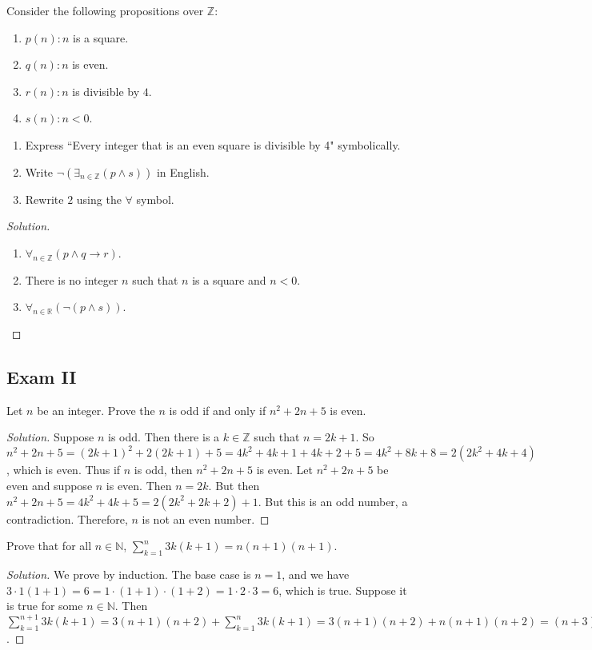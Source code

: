 \documentclass[../main.tex]{subfiles}
\begin{document}
\begin{problem}
Consider the following propositions over $\mathbb{Z}$:
\begin{enumerate}
\item[] $p(n):	n$ is a square.
\item[] $q(n):	n$ is even.
\item[] $r(n):	n$ is divisible by $4$.
\item[] $s(n):	n<0$.
\end{enumerate}
\begin{enumerate}
\item Express ``Every integer that is an even square is divisible by 4" symbolically.
\item Write $\neg(\exists_{n\in \mathbb{Z}}(p\land s))$ in English.
\item Rewrite $2$ using the $\forall$ symbol.
\end{enumerate}
\end{problem}
\begin{proof}[Solution]
\
\begin{enumerate}
\item $\forall_{n\in \mathbb{Z}}(p\land q \rightarrow r)$.
\item There is no integer $n$ such that $n$ is a square and $n<0$.
\item $\forall_{n\in \mathbb{R}}(\neg(p\land s))$.
\end{enumerate}
\end{proof}
%
\subsection{Exam II}
%
\begin{problem}
Let $n$ be an integer. Prove the $n$ is odd if and only if $n^2+2n+5$ is even.
\end{problem}
\begin{proof}[Solution]
Suppose $n$ is odd. Then there is a $k\in \mathbb{Z}$ such that $n = 2k+1$. So $n^2+2n+5 = (2k+1)^2+2(2k+1)+5 = 4k^2+4k+1+4k+2+5 = 4k^2+8k+8 = 2(2k^2+4k+4)$, which is even. Thus if $n$ is odd, then $n^2+2n+5$ is even. Let $n^2+2n+5$ be even and suppose $n$ is even. Then $n = 2k$. But then $n^2+2n+5 = 4k^2+4k+5 = 2(2k^2+2k+2)+1$. But this is an odd number, a contradiction. Therefore, $n$ is not an even number.
\end{proof}

\begin{problem}
Prove that for all $n\in \mathbb{N}$, $\sum_{k=1}^{n} 3k(k+1) = n(n+1)(n+1)$.
\end{problem}
\begin{proof}[Solution]
We prove by induction. The base case is $n=1$, and we have $3\cdot 1(1+1) = 6 = 1\cdot(1+1)\cdot(1+2) = 1\cdot 2 \cdot 3 = 6$, which is true. Suppose it is true for some $n\in \mathbb{N}$. Then $\sum_{k=1}^{n+1} 3k(k+1) = 3(n+1)(n+2) +\sum_{k=1}^{n} 3k(k+1) = 3(n+1)(n+2) +n(n+1)(n+2) = (n+3)(n+1)(n+2) = (n+1)\big((n+1)+1\big)\big((n+1)+2\big)$.
\end{proof}
\end{document}
